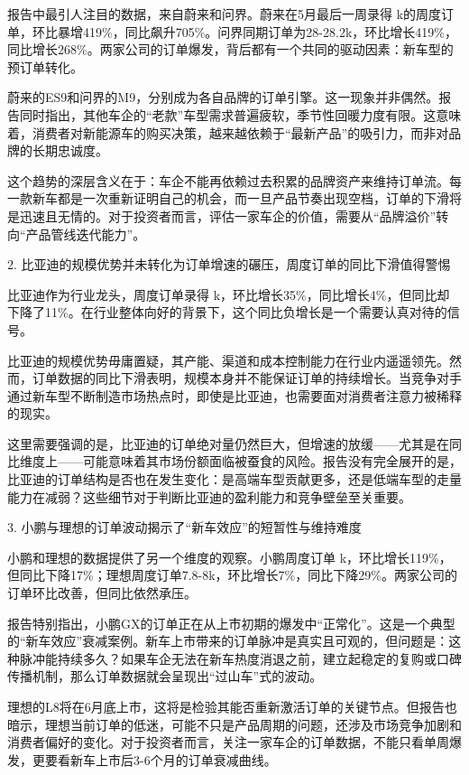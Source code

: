 \documentclass[11pt]{ctexart}
\begin{document}
报告中最引人注目的数据，来自蔚来和问界。蔚来在5月最后一周录得 k的周度订单，环比暴增419\%，同比飙升705\%。问界同期订单为28-28.2k，环比增长419\%，同比增长268\%。两家公司的订单爆发，背后都有一个共同的驱动因素：新车型的预订单转化。

蔚来的ES9和问界的M9，分别成为各自品牌的订单引擎。这一现象并非偶然。报告同时指出，其他车企的“老款”车型需求普遍疲软，季节性回暖力度有限。这意味着，消费者对新能源车的购买决策，越来越依赖于“最新产品”的吸引力，而非对品牌的长期忠诚度。

这个趋势的深层含义在于：车企不能再依赖过去积累的品牌资产来维持订单流。每一款新车都是一次重新证明自己的机会，而一旦产品节奏出现空档，订单的下滑将是迅速且无情的。对于投资者而言，评估一家车企的价值，需要从“品牌溢价”转向“产品管线迭代能力”。

2. 比亚迪的规模优势并未转化为订单增速的碾压，周度订单的同比下滑值得警惕

比亚迪作为行业龙头，周度订单录得 k，环比增长35\%，同比增长4\%，但同比却下降了11\%。在行业整体向好的背景下，这个同比负增长是一个需要认真对待的信号。

比亚迪的规模优势毋庸置疑，其产能、渠道和成本控制能力在行业内遥遥领先。然而，订单数据的同比下滑表明，规模本身并不能保证订单的持续增长。当竞争对手通过新车型不断制造市场热点时，即使是比亚迪，也需要面对消费者注意力被稀释的现实。

这里需要强调的是，比亚迪的订单绝对量仍然巨大，但增速的放缓——尤其是在同比维度上——可能意味着其市场份额面临被蚕食的风险。报告没有完全展开的是，比亚迪的订单结构是否也在发生变化：是高端车型贡献更多，还是低端车型的走量能力在减弱？这些细节对于判断比亚迪的盈利能力和竞争壁垒至关重要。

3. 小鹏与理想的订单波动揭示了“新车效应”的短暂性与维持难度

小鹏和理想的数据提供了另一个维度的观察。小鹏周度订单 k，环比增长119\%，但同比下降17\%；理想周度订单7.8-8k，环比增长7\%，同比下降29\%。两家公司的订单环比改善，但同比依然承压。

报告特别指出，小鹏GX的订单正在从上市初期的爆发中“正常化”。这是一个典型的“新车效应”衰减案例。新车上市带来的订单脉冲是真实且可观的，但问题是：这种脉冲能持续多久？如果车企无法在新车热度消退之前，建立起稳定的复购或口碑传播机制，那么订单数据就会呈现出“过山车”式的波动。

理想的L8将在6月底上市，这将是检验其能否重新激活订单的关键节点。但报告也暗示，理想当前订单的低迷，可能不只是产品周期的问题，还涉及市场竞争加剧和消费者偏好的变化。对于投资者而言，关注一家车企的订单数据，不能只看单周爆发，更要看新车上市后3-6个月的订单衰减曲线。
\end{document}

